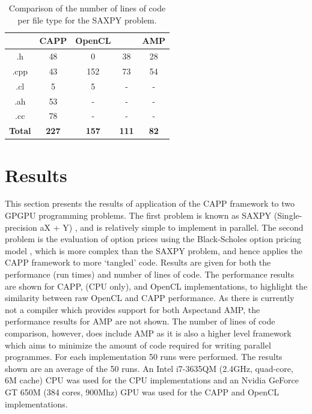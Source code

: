 \documentclass{sig-alternate-05-2015}
\begin{document}
\begin{table}[!b]
\centering
\caption{Comparison of the number of lines of code per file type for the SAXPY
problem.}
\label{tab:saxpy}
\begin{tabular}{|c|c|c|c|c|} 
	\hline
				    & CAPP			& OpenCL		& \CPP	    & \CPP AMP      \\ \hline
    .h				& 48			& 0				& 38	    & 28            \\ \hline
    .cpp			& 43			& 152			& 73	    & 54            \\ \hline
    .cl				& 5				& 5				& -		    & -             \\ \hline
    .ah				& 53			& -				& -		    & -             \\ \hline
    .cc				& 78			& -				& -		    & -             \\ \hline
    \textbf{Total}	& \textbf{227}	& \textbf{157}	& \textbf{111}	& \textbf{82}	\\ \hline		
\hline
\end{tabular}
\end{table}

\section{Results}\label{sec:results}

This section presents the results of application of the \mbox{CAPP} framework to two
GPGPU programming problems. The first problem is known as SAXPY
(Single-precision aX + Y) \cite{harris:saxpy}, and is relatively 
simple to implement in parallel. The second problem is the evaluation of option 
prices using the Black-Scholes option pricing model \cite{gems:blackscholes},
which is more complex than the SAXPY problem, and hence applies the  CAPP framework 
to more `tangled' \CPP code. Results are given for both the performance (run times) and
number of lines of code. The performance results are shown for CAPP, \CPP (CPU only), and OpenCL
implementations, to highlight the similarity between raw OpenCL and CAPP performance. As there is currently
not a compiler which provides support for both Aspect\CPP and \CPP AMP, the performance results for \CPP AMP are not shown. 
The number of lines of code comparison, however, does include \CPP AMP as it is also a higher level framework
which aims to minimize the amount of code required for writing parallel programmes.
For each implementation 50 runs were performed. The results shown are an average of the 50 runs. An Intel 
i7-3635QM (2.4GHz, quad-core, 6M cache) CPU was used for the CPU
implementations and an Nvidia GeForce GT 650M (384 cores, 900Mhz) GPU was used for
the CAPP and OpenCL implementations.
\end{document}
